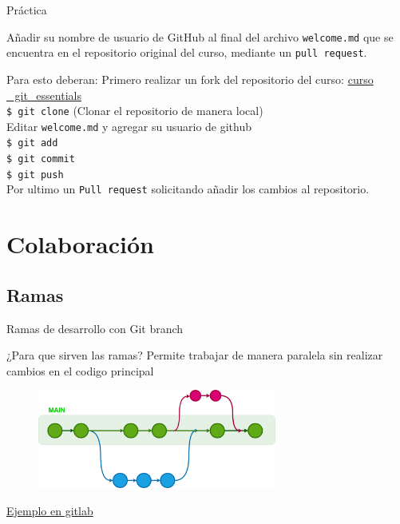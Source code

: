 \documentclass{beamer}
\begin{document}
\begin{frame}{\LARGE Práctica}
  
  \begin{alertblock}{}

    Añadir su nombre de usuario de GitHub al final del archivo \texttt{welcome.md} que se encuentra en el repositorio original del curso, mediante un \texttt{pull request}. 
    
  \end{alertblock}

  \begin{block}{Para esto deberan:}
    Primero realizar un fork del repositorio del curso: \href{https://github.com/paobtorres/curso_git_essentials}{curso  \_git\_essentials} \\ 
    \texttt{\$ git clone} (Clonar el repositorio de manera local) \\ 
    Editar \texttt{welcome.md} y agregar su usuario de github \\ 
    \texttt{\$ git add} \\ 
    \texttt{\$ git commit} \\ 
    \texttt{\$ git push} \\ 
    Por ultimo un \texttt{Pull request} solicitando añadir los cambios al repositorio. 
  \end{block}



\end{frame}




\section{Colaboración}

\subsection {Ramas}

  \begin{frame}{Ramas de desarrollo con Git branch}

    \begin{alertblock}{¿Para que sirven las ramas?}
      Permite trabajar de manera paralela sin realizar cambios en el codigo principal
    \end{alertblock}


     \begin{figure}
      \includegraphics[width=0.7\textwidth]{images/git-branch.png}
     \end{figure}

     \href{https://gitlab.com/blancoapa/pyMBE}{Ejemplo en gitlab}



  \end{frame}
\end{document}
